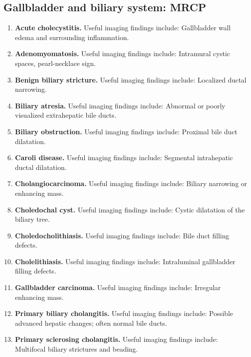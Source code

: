 \subsection{Gallbladder and biliary system: MRCP}
\begin{enumerate}[leftmargin=*,itemsep=0.45em,topsep=0.4em]
\item \textbf{Acute cholecystitis.} Useful imaging findings include: Gallbladder wall edema and surrounding inflammation.
\item \textbf{Adenomyomatosis.} Useful imaging findings include: Intramural cystic spaces, pearl-necklace sign.
\item \textbf{Benign biliary stricture.} Useful imaging findings include: Localized ductal narrowing.
\item \textbf{Biliary atresia.} Useful imaging findings include: Abnormal or poorly visualized extrahepatic bile ducts.
\item \textbf{Biliary obstruction.} Useful imaging findings include: Proximal bile duct dilatation.
\item \textbf{Caroli disease.} Useful imaging findings include: Segmental intrahepatic ductal dilatation.
\item \textbf{Cholangiocarcinoma.} Useful imaging findings include: Biliary narrowing or enhancing mass.
\item \textbf{Choledochal cyst.} Useful imaging findings include: Cystic dilatation of the biliary tree.
\item \textbf{Choledocholithiasis.} Useful imaging findings include: Bile duct filling defects.
\item \textbf{Cholelithiasis.} Useful imaging findings include: Intraluminal gallbladder filling defects.
\item \textbf{Gallbladder carcinoma.} Useful imaging findings include: Irregular enhancing mass.
\item \textbf{Primary biliary cholangitis.} Useful imaging findings include: Possible advanced hepatic changes; often normal bile ducts.
\item \textbf{Primary sclerosing cholangitis.} Useful imaging findings include: Multifocal biliary strictures and beading.
\end{enumerate}

